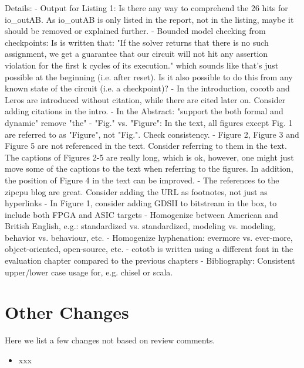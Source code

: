 \documentclass{article}
\begin{document}
Details:
- Output for Listing 1: Is there any way to comprehend the 26 hits for io\_outAB. As io\_outAB is only listed in the report, not in the listing, maybe it should be removed or explained further.
- Bounded model checking from checkpoints: Is is written that: "If the solver returns that there is no such assignment, we get a guarantee that our circuit will not hit any assertion violation for the first k cycles of its execution." which sounds like that's just possible at the beginning (i.e. after reset). Is it also possible to do this from any known state of the circuit (i.e. a checkpoint)?
- In the introduction, cocotb and Leros are introduced without citation, while there are cited later on. Consider adding citations in the intro.
- In the Abstract: "support the both formal and dynamic" remove "the"
- "Fig." vs. "Figure": In the text, all figures except Fig. 1 are referred to as "Figure", not "Fig.". Check consistency.
- Figure 2, Figure 3 and Figure 5 are not referenced in the text. Consider referring to them in the text. The captions of Figures 2-5 are really long, which is ok, however, one might just move some of the captions to the text when referring to the figures. In addition, the position of Figure 4 in the text can be improved. 
- The references to the zipcpu blog are great. Consider adding the URL as footnotes, not just as hyperlinks
- In Figure 1, consider adding GDSII to bitstream in the box, to include both FPGA and ASIC targets
- Homogenize between American and British English, e.g.: standardized vs. standardized, modeling vs. modeling, behavior vs. behaviour, etc.
- Homogenize hyphenation: evermore vs. ever-more, object-oriented, open-source, etc.
- cototb is written using a different font in the evaluation chapter compared to the previous chapters
- Bibliography: Consistent upper/lower case usage for, e.g. chisel or scala.




\section*{Other Changes}

Here we list a few changes not based on review comments.

\begin{itemize}
	\item xxx
\end{itemize}
\end{document}
